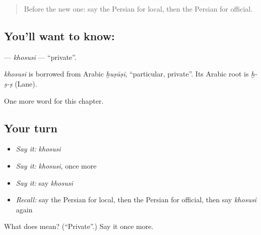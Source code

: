 \begin{quote}
Before the new one: say the Persian for local, then the Persian for official.
\end{quote}

\subsection*{You'll want to know: }
\textbf{} — \emph{khosusi} — \textquotedblleft{}private\textquotedblright{}.

\begin{cousinweb}
\emph{khosusi} is borrowed from Arabic \emph{ḫuṣūṣī}, \textquotedblleft{}particular, private\textquotedblright{}. Its Arabic root is \emph{ḫ-ṣ-ṣ} (Lane).
\end{cousinweb}

\begin{grammarlens}[title={What you've built}]
One more word for this chapter.
\end{grammarlens}

\subsection*{Your turn}
\begin{itemize}
\raggedright
  \item \emph{Say it:} \emph{khosusi}
  \item \emph{Say it:} \emph{khosusi}, once more
  \item \emph{Say it:} say \emph{khosusi}
  \item \emph{Recall:} say the Persian for local, then the Persian for official, then say \emph{khosusi} again
\end{itemize}

\begin{tcolorbox}[breakable,colback=teal!4,colframe=teal!35!black,title={Before you move on}]
What does  mean? (\textquotedblleft{}Private\textquotedblright{}.) Say it once more.
\end{tcolorbox}
